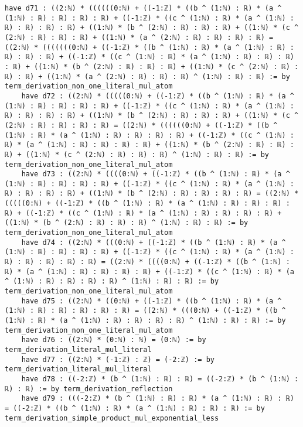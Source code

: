 \documentclass{article}
\begin{document}
\begin{tcolorbox}[colback=white!10, width=\linewidth]
\begin{lstlisting}[language=Lean4]
    have d71 : ((2:ℕ) * ((((((0:ℕ) + ((-1:ℤ) * ((b ^ (1:ℕ) : ℝ) * (a ^ (1:ℕ) : ℝ) : ℝ) : ℝ) : ℝ) + ((-1:ℤ) * ((c ^ (1:ℕ) : ℝ) * (a ^ (1:ℕ) : ℝ) : ℝ) : ℝ) : ℝ) + ((1:ℕ) * (b ^ (2:ℕ) : ℝ) : ℝ) : ℝ) + ((1:ℕ) * (c ^ (2:ℕ) : ℝ) : ℝ) : ℝ) + ((1:ℕ) * (a ^ (2:ℕ) : ℝ) : ℝ) : ℝ) : ℝ) = ((2:ℕ) * (((((((0:ℕ) + ((-1:ℤ) * ((b ^ (1:ℕ) : ℝ) * (a ^ (1:ℕ) : ℝ) : ℝ) : ℝ) : ℝ) + ((-1:ℤ) * ((c ^ (1:ℕ) : ℝ) * (a ^ (1:ℕ) : ℝ) : ℝ) : ℝ) : ℝ) + ((1:ℕ) * (b ^ (2:ℕ) : ℝ) : ℝ) : ℝ) + ((1:ℕ) * (c ^ (2:ℕ) : ℝ) : ℝ) : ℝ) + ((1:ℕ) * (a ^ (2:ℕ) : ℝ) : ℝ) : ℝ) ^ (1:ℕ) : ℝ) : ℝ) := by term_derivation_non_one_literal_mul_atom
    have d72 : ((2:ℕ) * (((((0:ℕ) + ((-1:ℤ) * ((b ^ (1:ℕ) : ℝ) * (a ^ (1:ℕ) : ℝ) : ℝ) : ℝ) : ℝ) + ((-1:ℤ) * ((c ^ (1:ℕ) : ℝ) * (a ^ (1:ℕ) : ℝ) : ℝ) : ℝ) : ℝ) + ((1:ℕ) * (b ^ (2:ℕ) : ℝ) : ℝ) : ℝ) + ((1:ℕ) * (c ^ (2:ℕ) : ℝ) : ℝ) : ℝ) : ℝ) = ((2:ℕ) * ((((((0:ℕ) + ((-1:ℤ) * ((b ^ (1:ℕ) : ℝ) * (a ^ (1:ℕ) : ℝ) : ℝ) : ℝ) : ℝ) + ((-1:ℤ) * ((c ^ (1:ℕ) : ℝ) * (a ^ (1:ℕ) : ℝ) : ℝ) : ℝ) : ℝ) + ((1:ℕ) * (b ^ (2:ℕ) : ℝ) : ℝ) : ℝ) + ((1:ℕ) * (c ^ (2:ℕ) : ℝ) : ℝ) : ℝ) ^ (1:ℕ) : ℝ) : ℝ) := by term_derivation_non_one_literal_mul_atom
    have d73 : ((2:ℕ) * ((((0:ℕ) + ((-1:ℤ) * ((b ^ (1:ℕ) : ℝ) * (a ^ (1:ℕ) : ℝ) : ℝ) : ℝ) : ℝ) + ((-1:ℤ) * ((c ^ (1:ℕ) : ℝ) * (a ^ (1:ℕ) : ℝ) : ℝ) : ℝ) : ℝ) + ((1:ℕ) * (b ^ (2:ℕ) : ℝ) : ℝ) : ℝ) : ℝ) = ((2:ℕ) * (((((0:ℕ) + ((-1:ℤ) * ((b ^ (1:ℕ) : ℝ) * (a ^ (1:ℕ) : ℝ) : ℝ) : ℝ) : ℝ) + ((-1:ℤ) * ((c ^ (1:ℕ) : ℝ) * (a ^ (1:ℕ) : ℝ) : ℝ) : ℝ) : ℝ) + ((1:ℕ) * (b ^ (2:ℕ) : ℝ) : ℝ) : ℝ) ^ (1:ℕ) : ℝ) : ℝ) := by term_derivation_non_one_literal_mul_atom
    have d74 : ((2:ℕ) * (((0:ℕ) + ((-1:ℤ) * ((b ^ (1:ℕ) : ℝ) * (a ^ (1:ℕ) : ℝ) : ℝ) : ℝ) : ℝ) + ((-1:ℤ) * ((c ^ (1:ℕ) : ℝ) * (a ^ (1:ℕ) : ℝ) : ℝ) : ℝ) : ℝ) : ℝ) = ((2:ℕ) * ((((0:ℕ) + ((-1:ℤ) * ((b ^ (1:ℕ) : ℝ) * (a ^ (1:ℕ) : ℝ) : ℝ) : ℝ) : ℝ) + ((-1:ℤ) * ((c ^ (1:ℕ) : ℝ) * (a ^ (1:ℕ) : ℝ) : ℝ) : ℝ) : ℝ) ^ (1:ℕ) : ℝ) : ℝ) := by term_derivation_non_one_literal_mul_atom
    have d75 : ((2:ℕ) * ((0:ℕ) + ((-1:ℤ) * ((b ^ (1:ℕ) : ℝ) * (a ^ (1:ℕ) : ℝ) : ℝ) : ℝ) : ℝ) : ℝ) = ((2:ℕ) * (((0:ℕ) + ((-1:ℤ) * ((b ^ (1:ℕ) : ℝ) * (a ^ (1:ℕ) : ℝ) : ℝ) : ℝ) : ℝ) ^ (1:ℕ) : ℝ) : ℝ) := by term_derivation_non_one_literal_mul_atom
    have d76 : ((2:ℕ) * (0:ℕ) : ℕ) = (0:ℕ) := by term_derivation_literal_mul_literal
    have d77 : ((2:ℕ) * (-1:ℤ) : ℤ) = (-2:ℤ) := by term_derivation_literal_mul_literal
    have d78 : ((-2:ℤ) * (b ^ (1:ℕ) : ℝ) : ℝ) = ((-2:ℤ) * (b ^ (1:ℕ) : ℝ) : ℝ) := by term_derivation_reflection
    have d79 : (((-2:ℤ) * (b ^ (1:ℕ) : ℝ) : ℝ) * (a ^ (1:ℕ) : ℝ) : ℝ) = ((-2:ℤ) * ((b ^ (1:ℕ) : ℝ) * (a ^ (1:ℕ) : ℝ) : ℝ) : ℝ) := by term_derivation_simple_product_mul_exponential_less

\end{lstlisting}
\end{tcolorbox}
\end{document}
